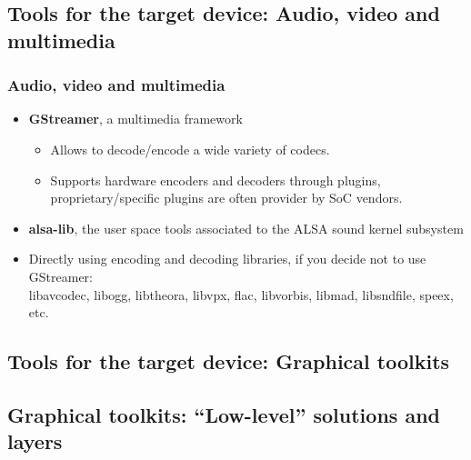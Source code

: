 \subsection[Multimedia tools]{Tools for the target device: Audio,
  video and multimedia}

\begin{frame}
  \frametitle{Audio, video and multimedia}
  \begin{itemize}
  \item {\bf GStreamer}, a multimedia framework
    \begin{itemize}
    \item Allows to decode/encode a wide variety of codecs.
    \item Supports hardware encoders and decoders through plugins,
      proprietary/specific plugins are often provider by SoC vendors.
    \end{itemize}
  \item {\bf alsa-lib}, the user space tools associated to the ALSA sound
    kernel subsystem
  \item Directly using encoding and decoding libraries, if you decide
    not to use GStreamer:\\
    libavcodec, libogg, libtheora, libvpx, flac, libvorbis, libmad,
    libsndfile, speex, etc.
  \end{itemize}
\end{frame}

\subsection[Graphical toolkits]{Tools for the target device: Graphical
  toolkits}

\subsection[Low-level toolkits]{Graphical toolkits:
``Low-level'' solutions and layers}

